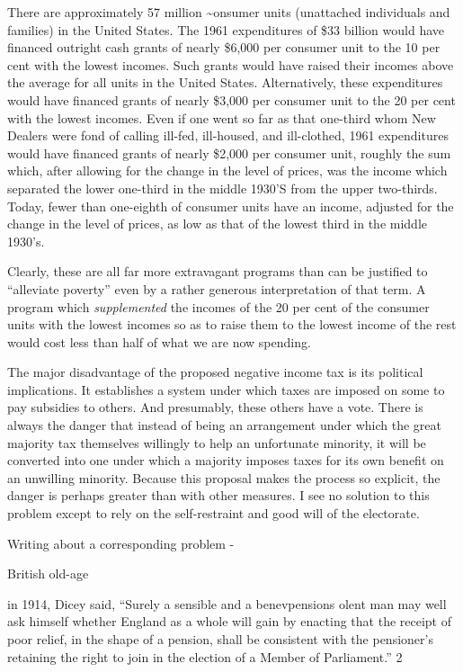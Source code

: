 \documentclass[11pt,openany]{book}
\begin{document}
There are approximately 57 million \textasciitilde{}onsumer units (unattached individuals and families) in the United States. The 1961 expenditures of \$33 billion would have financed outright cash grants of nearly \$6,000 per consumer unit to the 10 per cent with the lowest incomes. Such grants would have raised their incomes above the average for all units in the United States. Alternatively, these expenditures would have financed grants of nearly \$3,000 per consumer unit to the 20 per cent with the lowest incomes. Even if one went so far as that one-third whom New Dealers were fond of calling ill-fed, ill-housed, and ill-clothed, 1961 expenditures would have financed grants of nearly \$2,000 per consumer unit, roughly the sum which, after allowing for the change in the level of prices, was the income which separated the lower one-third in the middle 1930'S from the upper two-thirds. Today, fewer than one-eighth of consumer units have an income, adjusted for the change in the level of prices, as low as that of the lowest third in the middle 1930's.

Clearly, these are all far more extravagant programs than can be justified to ``alleviate poverty'' even by a rather generous interpretation of that term. A program which \emph{supplemented} the incomes of the 20 per cent of the consumer units with the lowest incomes so as to raise them to the lowest income of the rest would cost less than half of what we are now spending.

The major disadvantage of the proposed negative income tax is its political implications. It establishes a system under which taxes are imposed on some to pay subsidies to others. And presumably, these others have a vote. There is always the danger that instead of being an arrangement under which the great majority tax themselves willingly to help an unfortunate minority, it will be converted into one under which a majority imposes taxes for its own benefit on an unwilling minority. Because this proposal makes the process so explicit, the danger is perhaps greater than with other measures. I see no solution to this problem except to rely on the self-restraint and good will of the electorate.

Writing about a corresponding problem -

British old-age

in 1914, Dicey said, ``Surely a sensible and a benevpensions olent man may well ask himself whether England as a whole will gain by enacting that the receipt of poor relief, in the shape of a pension, shall be consistent with the pensioner's retaining the right to join in the election of a Member of Parliament.'' 2
\end{document}
